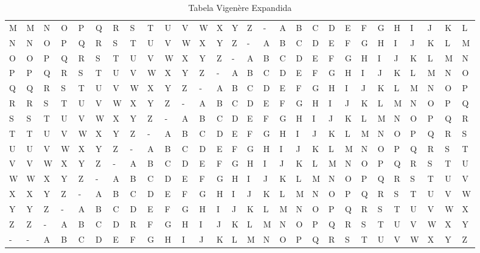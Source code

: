 \documentclass[10pt,a4paper]{article}
\begin{document}
\begin{landscape}
\begin{table}[!htb]
\begin{tabular}{|l|l|l|l|l|l|l|l|l|l|l|l|l|l|l|l|l|l|l|l|l|l|l|l|l|l|l|l|}
        M & M & N & O & P & Q & R & S & T & U & V & W & X & Y & Z & - & A & B & C & D & E & F & G & H & I & J & K & L \\ 
        N & N & O & P & Q & R & S & T & U & V & W & X & Y & Z & - & A & B & C & D & E & F & G & H & I & J & K & L & M \\ 
        O & O & P & Q & R & S & T & U & V & W & X & Y & Z & - & A & B & C & D & E & F & G & H & I & J & K & L & M & N \\ 
        P & P & Q & R & S & T & U & V & W & X & Y & Z & - & A & B & C & D & E & F & G & H & I & J & K & L & M & N & O \\ 
        Q & Q & R & S & T & U & V & W & X & Y & Z & - & A & B & C & D & E & F & G & H & I & J & K & L & M & N & O & P \\ 
        R & R & S & T & U & V & W & X & Y & Z & - & A & B & C & D & E & F & G & H & I & J & K & L & M & N & O & P & Q \\ 
        S & S & T & U & V & W & X & Y & Z & - & A & B & C & D & E & F & G & H & I & J & K & L & M & N & O & P & Q & R \\ 
        T & T & U & V & W & X & Y & Z & - & A & B & C & D & E & F & G & H & I & J & K & L & M & N & O & P & Q & R & S \\ 
        U & U & V & W & X & Y & Z & - & A & B & C & D & E & F & G & H & I & J & K & L & M & N & O & P & Q & R & S & T \\ 
        V & V & W & X & Y & Z & - & A & B & C & D & E & F & G & H & I & J & K & L & M & N & O & P & Q & R & S & T & U \\ 
        W & W & X & Y & Z & - & A & B & C & D & E & F & G & H & I & J & K & L & M & N & O & P & Q & R & S & T & U & V \\ 
        X & X & Y & Z & - & A & B & C & D & E & F & G & H & I & J & K & L & M & N & O & P & Q & R & S & T & U & V & W \\ 
        Y & Y & Z & - & A & B & C & D & E & F & G & H & I & J & K & L & M & N & O & P & Q & R & S & T & U & V & W & X \\ 
        Z & Z & - & A & B & C & D & R & F & G & H & I & J & K & L & M & N & O & P & Q & R & S & T & U & V & W & X & Y \\ 
        - & - & A & B & C & D & E & F & G & H & I & J & K & L & M & N & O & P & Q & R & S & T & U & V & W & X & Y & Z \\
        \hline
    \end{tabular}
\caption{Tabela Vigenère Expandida}\label{tab:table_vigenere}
\end{table}
\end{landscape}
\end{document}
